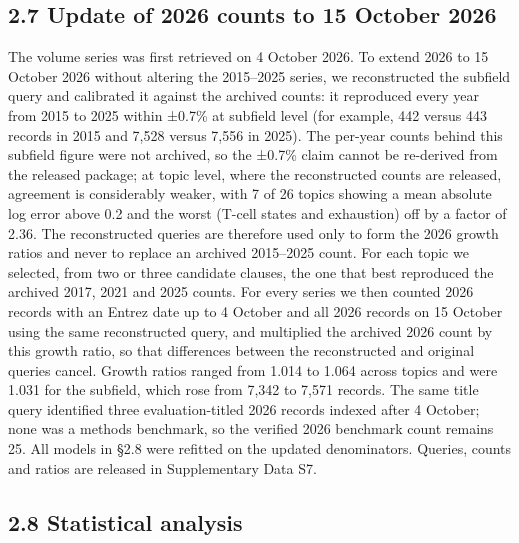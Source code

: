 \documentclass{article}
\begin{document}
\subsection{2.7 Update of 2026 counts to 15 October 2026}\label{update-of-2026-counts-to-15-october-2026}

The volume series was first retrieved on 4 October 2026. To extend 2026
to 15 October 2026 without altering the 2015--2025 series, we
reconstructed the subfield query and calibrated it against the archived
counts: it reproduced every year from 2015 to 2025 within ±0.7\% at
subfield level (for example, 442 versus 443 records in 2015 and 7,528
versus 7,556 in 2025). The per-year counts behind this subfield figure
were not archived, so the ±0.7\% claim cannot be re-derived from the
released package; at topic level, where the reconstructed counts are
released, agreement is considerably weaker, with 7 of 26 topics showing
a mean absolute log error above 0.2 and the worst (T-cell states and
exhaustion) off by a factor of 2.36. The reconstructed queries are
therefore used only to form the 2026 growth ratios and never to replace
an archived 2015--2025 count. For each topic we selected, from two or
three candidate clauses, the one that best reproduced the archived 2017,
2021 and 2025 counts. For every series we then counted 2026 records with
an Entrez date up to 4 October and all 2026 records on 15 October using
the same reconstructed query, and multiplied the archived 2026 count by
this growth ratio, so that differences between the reconstructed and
original queries cancel. Growth ratios ranged from 1.014 to 1.064 across
topics and were 1.031 for the subfield, which rose from 7,342 to 7,571
records. The same title query identified three evaluation-titled 2026
records indexed after 4 October; none was a methods benchmark, so the
verified 2026 benchmark count remains 25. All models in §2.8 were
refitted on the updated denominators. Queries, counts and ratios are
released in Supplementary Data S7.

\subsection{2.8 Statistical analysis}\label{statistical-analysis}
\end{document}
